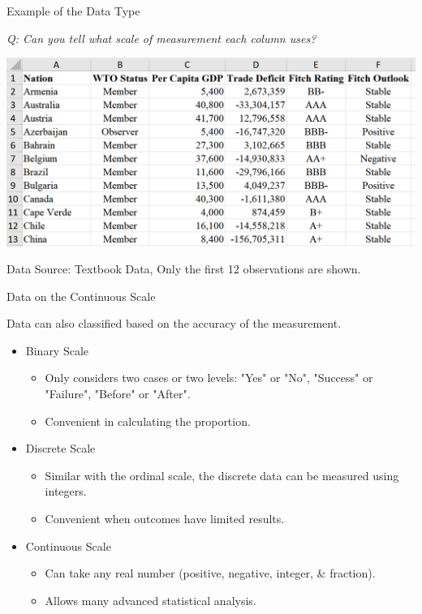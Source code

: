 \documentclass{beamer}
\begin{document}
\begin{frame}{Example of the Data Type}

\begin{center}
\textit{Q: Can you tell what scale of measurement each column uses? 
}
\end{center}
\begin{center}
\includegraphics[scale=0.55]{images/scaleTypeDataExample.png}
\end{center}
\begin{scriptsize}
Data Source: Textbook Data, Only the first 12 observations are shown.
\end{scriptsize}
\end{frame}





\begin{frame}{Data on the Continuous Scale}

Data can also classified based on the accuracy of the measurement.

\vspace{10pt}
\begin{itemize}
\item Binary Scale
\begin{itemize}
\item Only considers two cases or two levels: "Yes" or "No", "Success" or "Failure", "Before" or "After".
\item Convenient in calculating the proportion. 
\end{itemize}
\item Discrete Scale
\begin{itemize}
\item Similar with the ordinal scale, the discrete data can be measured using integers.
\item Convenient when outcomes have limited results.
\end{itemize}

\item Continuous Scale
\begin{itemize}
\item Can take any real number (positive, negative, integer, \& fraction).
\item Allows many advanced statistical analysis.
\end{itemize}
\end{itemize}

\end{frame}
\end{document}
